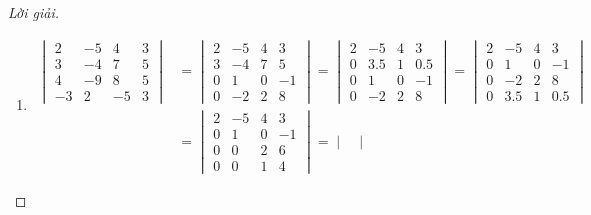 \documentclass[class=nhvh-linear-algebra,crop=false]{standalone}
\begin{document}
\begin{proof}[Lời giải]
    \begin{enumerate}[label = (\alph*)]
        \item
              \begin{align*}
                  \begin{vmatrix}
                      2  & -5 & 4  & 3 \\
                      3  & -4 & 7  & 5 \\
                      4  & -9 & 8  & 5 \\
                      -3 & 2  & -5 & 3
                  \end{vmatrix}
                   & =
                  \begin{vmatrix}
                      2 & -5 & 4 & 3  \\
                      3 & -4 & 7 & 5  \\
                      0 & 1  & 0 & -1 \\
                      0 & -2 & 2 & 8
                  \end{vmatrix}
                  =
                  \begin{vmatrix}
                      2 & -5  & 4 & 3   \\
                      0 & 3.5 & 1 & 0.5 \\
                      0 & 1   & 0 & -1  \\
                      0 & -2  & 2 & 8
                  \end{vmatrix}
                  =
                  \begin{vmatrix}
                      2 & -5  & 4 & 3   \\
                      0 & 1   & 0 & -1  \\
                      0 & -2  & 2 & 8   \\
                      0 & 3.5 & 1 & 0.5
                  \end{vmatrix} \\
                   & =
                  \begin{vmatrix}
                      2 & -5 & 4 & 3  \\
                      0 & 1  & 0 & -1 \\
                      0 & 0  & 2 & 6  \\
                      0 & 0  & 1 & 4
                  \end{vmatrix}
                  =
                  \begin{vmatrix}

\end{vmatrix}
\end{align*}
\end{enumerate}
\end{proof}
\end{document}
